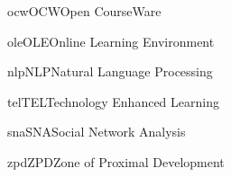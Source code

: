 

\newacronym
{ocw}{OCW}{Open CourseWare}

\newacronym
{ole}{OLE}{Online Learning Environment}

\newacronym
{nlp}{NLP}{Natural Language Processing}

\newacronym
{tel}{TEL}{Technology Enhanced Learning}

\newacronym
{sna}{SNA}{Social Network Analysis}

\newacronym
{zpd}{ZPD}{Zone of Proximal Development}

